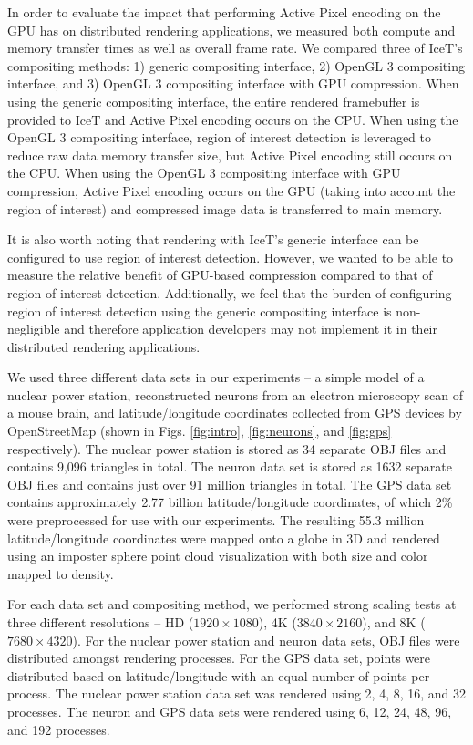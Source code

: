 \documentclass{vgtc}                          %
\newcommand{\textapprox}{\raisebox{0.5ex}{\texttildelow}}
\begin{document}
In order to evaluate the impact that performing Active Pixel encoding on the GPU has on distributed rendering applications, we measured both compute and memory transfer times as well as overall frame rate. We compared three of IceT's compositing methods: 1) generic compositing interface, 2) OpenGL 3 compositing interface, and 3) OpenGL 3 compositing interface with GPU compression. When using the generic compositing interface, the entire rendered framebuffer is provided to IceT and Active Pixel encoding occurs on the CPU. When using the OpenGL 3 compositing interface, region of interest detection is leveraged to reduce raw data memory transfer size, but Active Pixel encoding still occurs on the CPU. When using the OpenGL 3 compositing interface with GPU compression, Active Pixel encoding occurs on the GPU (taking into account the region of interest) and compressed image data is transferred to main memory.

It is also worth noting that rendering with IceT's generic interface can be configured to use region of interest detection. However, we wanted to be able to measure the relative benefit of GPU-based compression compared to that of region of interest detection. Additionally, we feel that the burden of configuring region of interest detection using the generic compositing interface is non-negligible and therefore application developers may not implement it in their distributed rendering applications.

We used three different data sets in our experiments -- a simple model of a nuclear power station, reconstructed neurons from an electron microscopy scan of a mouse brain, and latitude/longitude coordinates collected from GPS devices by OpenStreetMap (shown in Figs. \ref{fig:intro}, \ref{fig:neurons}, and \ref{fig:gps} respectively). The nuclear power station is stored as 34 separate OBJ files and contains 9,096 triangles in total. The neuron data set is stored as 1632 separate OBJ files and contains just over 91 million triangles in total. The GPS data set contains approximately 2.77 billion latitude/longitude coordinates, of which 2\% were preprocessed for use with our experiments. The resulting \textapprox{}55.3 million latitude/longitude coordinates were mapped onto a globe in 3D and rendered using an imposter sphere point cloud visualization with both size and color mapped to density.

For each data set and compositing method, we performed strong scaling tests at three different resolutions -- HD ($1920\times1080$), 4K ($3840\times2160$), and 8K ($7680\times4320$). For the nuclear power station and neuron data sets, OBJ files were distributed amongst rendering processes. For the GPS data set, points were distributed based on latitude/longitude with an equal number of points per process. The nuclear power station data set was rendered using 2, 4, 8, 16, and 32 processes. The neuron and GPS data sets were rendered using 6, 12, 24, 48, 96, and 192 processes.
\end{document}

